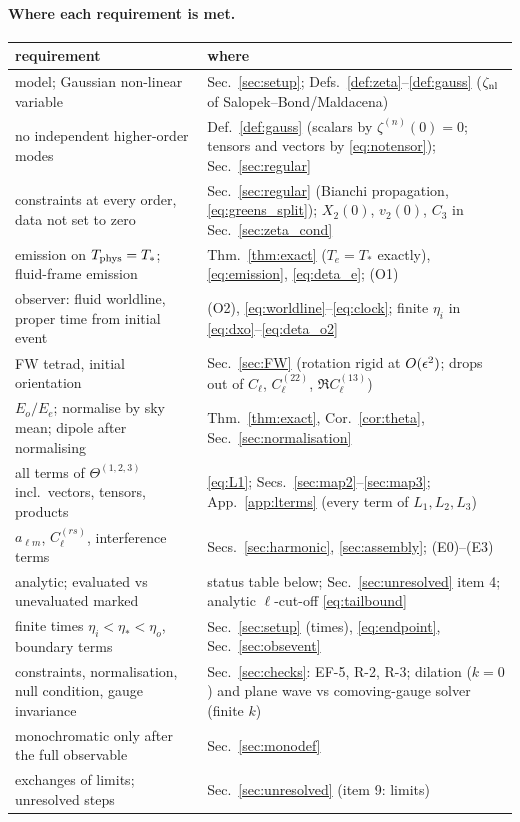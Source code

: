\paragraph{Where each requirement is met.}\mbox{}\par\noindent
{\footnotesize\setlength{\tabcolsep}{3pt}
\begin{tabular}{@{}p{}p{}@{}}
\hline
requirement & where \\ \hline
model; Gaussian non-linear variable & Sec.~\ref{sec:setup}; Defs.~\ref{def:zeta}--\ref{def:gauss} ($\zeta_{\rm nl}$ of Salopek--Bond/Maldacena) \\
no independent higher-order modes & Def.~\ref{def:gauss} (scalars by $\zeta^{(n)}(0)=0$; tensors and vectors by \eqref{eq:notensor}); Sec.~\ref{sec:regular} \\
constraints at every order, data not set to zero & Sec.~\ref{sec:regular} (Bianchi propagation, \eqref{eq:greens_split}); $X_2(0)$, $v_2(0)$, $C_3$ in Sec.~\ref{sec:zeta_cond} \\
emission on $T_{\rm phys}=T_*$; fluid-frame emission & Thm.~\ref{thm:exact} ($T_e=T_*$ exactly), \eqref{eq:emission}, \eqref{eq:deta_e}; (O1) \\
observer: fluid worldline, proper time from initial event & (O2), \eqref{eq:worldline}--\eqref{eq:clock}; finite $\eta_i$ in \eqref{eq:dxo}--\eqref{eq:deta_o2} \\
FW tetrad, initial orientation & Sec.~\ref{sec:FW} (rotation rigid at $O(\epsilon^2)$; drops out of $C_\ell$, $C^{(22)}_\ell$, $\Re C^{(13)}_\ell$) \\
$E_o/E_e$; normalise by sky mean; dipole after normalising & Thm.~\ref{thm:exact}, Cor.~\ref{cor:theta}, Sec.~\ref{sec:normalisation} \\
all terms of $\Theta^{(1,2,3)}$ incl.\ vectors, tensors, products & \eqref{eq:L1}; Secs.~\ref{sec:map2}--\ref{sec:map3}; App.~\ref{app:lterms} (every term of $L_1,L_2,L_3$) \\
$a_{\ell m}$, $C^{(rs)}_\ell$, interference terms & Secs.~\ref{sec:harmonic}, \ref{sec:assembly}; (E0)--(E3) \\
analytic; evaluated vs unevaluated marked & status table below; Sec.~\ref{sec:unresolved} item 4; analytic $\ell$-cut-off \eqref{eq:tailbound} \\
finite times $\eta_i<\eta_*<\eta_o$, boundary terms & Sec.~\ref{sec:setup} (times), \eqref{eq:endpoint}, Sec.~\ref{sec:obsevent} \\
constraints, normalisation, null condition, gauge invariance & Sec.~\ref{sec:checks}: EF-5, R-2, R-3; dilation ($k=0$) and plane wave vs comoving-gauge solver (finite $k$) \\
monochromatic only after the full observable & Sec.~\ref{sec:monodef} \\
exchanges of limits; unresolved steps & Sec.~\ref{sec:unresolved} (item 9: limits) \\ \hline
\end{tabular}}

